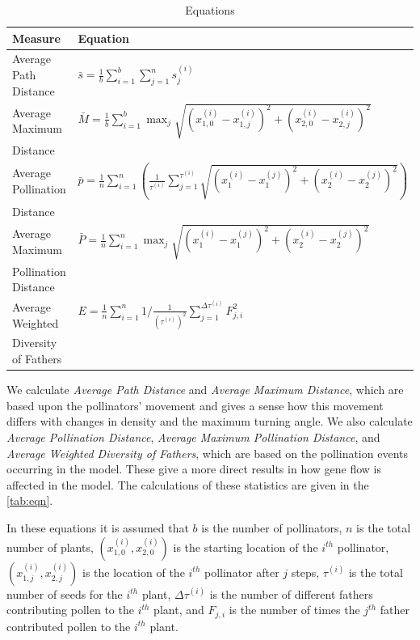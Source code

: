 \begin{table}[h]
\setlength{\extrarowheight}{10pt}
{\footnotesize
\begin{tabular}{|l|l|}
  \hline
  Measure & Equation \\[8pt] \hline   \hline
  Average Path Distance & $\bar{s} = \frac{1}{b} \sum_{i=1}^b \sum_{j=1}^n s^{\left(i\right)}_j$ \\[8pt] \hline
  Average Maximum & $ \bar{M} = \frac{1}{b} \sum_{i=1}^b \max_j \sqrt{\left(x^{\left(i\right)}_{1,0}
- x^{\left(i\right)}_{1,j}\right)^2 +
      \left(x^{\left(i\right)}_{2,0} -
x^{\left(i\right)}_{2,j}\right)^2}  $ \\[8pt]
 Distance & \\ \hline
  Average Pollination  & $ \bar{p} = \frac{1}{n} \sum_{i=1}^{n} \left(
\frac{1}{\tau^{\left(i\right)}} \sum_{j=1}^{\tau^{\left(i\right)}}
\sqrt{\left(x^{\left(i\right)}_1 -
x^{\left(j\right)}_1\right)^2 + \left(x^{\left(i\right)}_2 -
    x^{\left(j\right)}_2\right)^2}
    \right)  $ \\[12pt]
    Distance & \\ \hline
  Average Maximum  & $ \bar{P} = \frac{1}{n} \sum_{i=1}^{n} \max_j \sqrt{\left(x^{\left(i\right)}_1 -
x^{\left(j\right)}_1\right)^2 + \left(x^{\left(i\right)}_2 -
    x^{\left(j\right)}_2\right)^2}$ \\[8pt]
   Pollination Distance & \\ \hline
  Average Weighted   & $ E = \frac{1}{n} \sum_{i=1}^n 1/\frac{1}{\left(\tau^{\left(i\right)}\right)^2}
  \sum_{j=1}^{\Delta\tau^{\left(i\right)}} F^2_{j,i} $ \\[8pt]
  Diversity of Fathers & \\
  \hline
\end{tabular}
}
\caption{Equations}
\label{tab:eqn}
\end{table}

We calculate \emph{Average Path Distance} and \emph{Average Maximum Distance}, which are based upon the pollinators' movement and gives a sense how this movement differs with changes in density and the maximum turning angle.  We also calculate
\emph{Average Pollination Distance}, \emph{Average Maximum Pollination Distance}, and \emph{Average
Weighted Diversity of Fathers}, which are based on the pollination events occurring in the model.  These give a more direct results in how gene flow is affected in the model.
The calculations of these statistics are given in the \autoref{tab:eqn}.

In these equations it is assumed that $b$ is the number of pollinators, $n$ is the total number
of plants, $(x_{1,0}^{(i)},x_{2,0}^{(i)})$ is the starting location of the $i^{th}$ pollinator,
$(x_{1,j}^{(i)},x_{2,j}^{(i)})$ is the location of the $i^{th}$ pollinator after $j$ steps,
$\tau^{(i)}$ is the total number of seeds for the $i^{th}$ plant, $\Delta\tau^{(i)}$ is the number
of different fathers contributing pollen to the $i^{th}$ plant, and $F_{j,i}$ is the number of
times the $j^{th}$ father contributed pollen to the $i^{th}$ plant.

